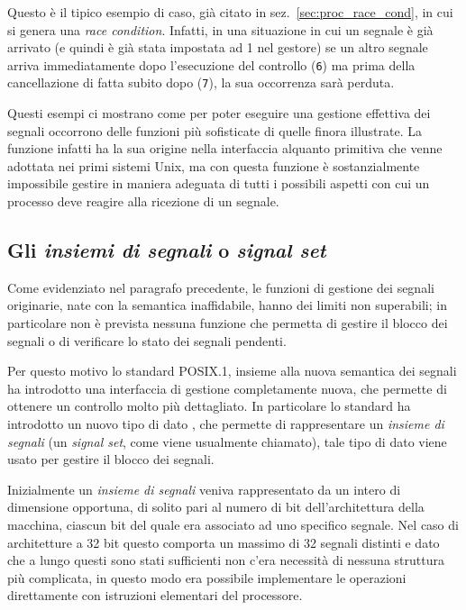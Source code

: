 Questo è il tipico esempio di caso, già citato in
sez.~\ref{sec:proc_race_cond}, in cui si genera una \textit{race
  condition}. Infatti, in una situazione in cui un segnale è già arrivato (e
quindi  è già stata impostata ad 1 nel gestore) se un altro segnale
arriva immediatamente dopo l'esecuzione del controllo (\texttt{\small 6}) ma
prima della cancellazione di  fatta subito dopo (\texttt{\small 7}),
la sua occorrenza sarà perduta.

Questi esempi ci mostrano come per poter eseguire una gestione effettiva dei
segnali occorrono delle funzioni più sofisticate di quelle finora
illustrate. La funzione  infatti ha la sua origine nella
interfaccia alquanto primitiva che venne adottata nei primi sistemi Unix, ma
con questa funzione è sostanzialmente impossibile gestire in maniera adeguata
di tutti i possibili aspetti con cui un processo deve reagire alla ricezione
di un segnale.



\subsection{Gli \textsl{insiemi di segnali} o \textit{signal set}}
\label{sec:sig_sigset}


Come evidenziato nel paragrafo precedente, le funzioni di gestione dei segnali
originarie, nate con la semantica inaffidabile, hanno dei limiti non
superabili; in particolare non è prevista nessuna funzione che permetta di
gestire il blocco dei segnali o di verificare lo stato dei segnali pendenti.

Per questo motivo lo standard POSIX.1, insieme alla nuova semantica dei
segnali ha introdotto una interfaccia di gestione completamente nuova, che
permette di ottenere un controllo molto più dettagliato. In particolare lo
standard ha introdotto un nuovo tipo di dato , che permette di
rappresentare un \textsl{insieme di segnali} (un \textit{signal set}, come
viene usualmente chiamato), tale tipo di dato viene usato per gestire il
blocco dei segnali.

Inizialmente un \textsl{insieme di segnali} veniva rappresentato da un intero
di dimensione opportuna, di solito pari al numero di bit dell'architettura
della macchina, ciascun bit del quale era associato ad uno specifico
segnale. Nel caso di architetture a 32 bit questo comporta un massimo di 32
segnali distinti e dato che a lungo questi sono stati sufficienti non c'era
necessità di nessuna struttura più complicata, in questo modo era possibile
implementare le operazioni direttamente con istruzioni elementari del
processore. 

